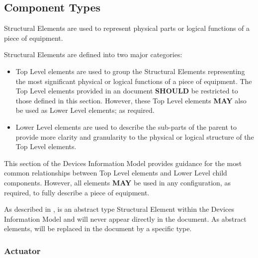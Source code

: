 \subsection{Component Types} \label{sec:Component Types}


 \glspl{Structural Element} are used to represent physical parts or logical functions of a piece of equipment.

 \glspl{Structural Element} are defined into two major categories:

\begin{itemize}

\item \gls{Top Level}  elements are used to group the \glspl{Structural Element} representing the most significant physical or logical functions of a piece of equipment.  The \gls{Top Level}  elements provided in an  document \textbf{SHOULD} be restricted to those defined in this section.  However, these \gls{Top Level}  elements \textbf{MAY} also be used as \gls{Lower Level}  elements; as required.

\item \gls{Lower Level}  elements are used to describe the sub-parts of the parent  to provide more clarity and granularity to the physical or logical structure of the \gls{Top Level}  elements.
\end{itemize}

This section of the \gls{Devices Information Model} provides guidance for the most common relationships between \gls{Top Level}  elements and \gls{Lower Level} child components.  However, all  elements \textbf{MAY} be used in any configuration, as required, to fully describe a piece of equipment.

As described in ,  is an abstract type \gls{Structural Element} within the \gls{Devices Information Model} and will never appear directly in the  document.  As abstract elements,  will be replaced in the document by a specific  type.


\subsubsection{Actuator}
\label{sec:Actuator}




